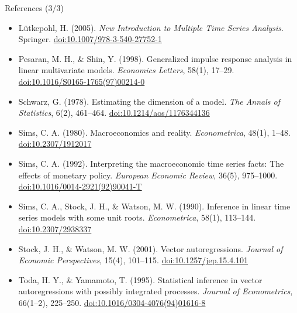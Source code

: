 \begin{frame}{References (3/3)}
\itemsize{\scriptsize}
\begin{itemize}
    \item Lütkepohl, H. (2005). \textit{New Introduction to Multiple Time Series Analysis}. Springer. \href{https://doi.org/10.1007/978-3-540-27752-1}{doi:10.1007/978-3-540-27752-1}
    \item Pesaran, M. H., \& Shin, Y. (1998). Generalized impulse response analysis in linear multivariate models. \textit{Economics Letters}, 58(1), 17--29. \href{https://doi.org/10.1016/S0165-1765(97)00214-0}{doi:10.1016/S0165-1765(97)00214-0}
    \item Schwarz, G. (1978). Estimating the dimension of a model. \textit{The Annals of Statistics}, 6(2), 461--464. \href{https://doi.org/10.1214/aos/1176344136}{doi:10.1214/aos/1176344136}
    \item Sims, C. A. (1980). Macroeconomics and reality. \textit{Econometrica}, 48(1), 1--48. \href{https://doi.org/10.2307/1912017}{doi:10.2307/1912017}
    \item Sims, C. A. (1992). Interpreting the macroeconomic time series facts: The effects of monetary policy. \textit{European Economic Review}, 36(5), 975--1000. \href{https://doi.org/10.1016/0014-2921(92)90041-T}{doi:10.1016/0014-2921(92)90041-T}
    \item Sims, C. A., Stock, J. H., \& Watson, M. W. (1990). Inference in linear time series models with some unit roots. \textit{Econometrica}, 58(1), 113--144. \href{https://doi.org/10.2307/2938337}{doi:10.2307/2938337}
    \item Stock, J. H., \& Watson, M. W. (2001). Vector autoregressions. \textit{Journal of Economic Perspectives}, 15(4), 101--115. \href{https://doi.org/10.1257/jep.15.4.101}{doi:10.1257/jep.15.4.101}
    \item Toda, H. Y., \& Yamamoto, T. (1995). Statistical inference in vector autoregressions with possibly integrated processes. \textit{Journal of Econometrics}, 66(1--2), 225--250. \href{https://doi.org/10.1016/0304-4076(94)01616-8}{doi:10.1016/0304-4076(94)01616-8}
\end{itemize}
\end{frame}



